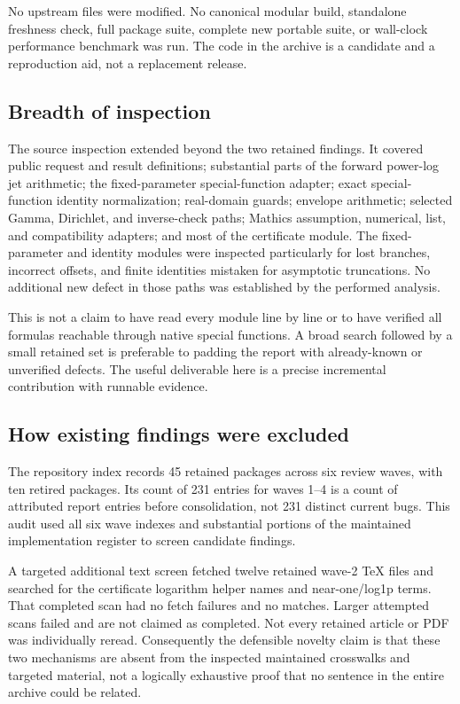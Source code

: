 \documentclass[11pt,letterpaper]{article}
\theoremstyle{remark}\newtheorem{remark}[proposition]{Remark}
\begin{document}
No upstream files were modified. No canonical modular build, standalone
freshness check, full package suite, complete new portable suite, or
wall-clock performance benchmark was run. The code in the archive is a
candidate and a reproduction aid, not a replacement release.

\subsection{Breadth of inspection}
The source inspection extended beyond the two retained findings. It covered
public request and result definitions; substantial parts of the forward
power-log jet arithmetic; the fixed-parameter special-function adapter; exact
special-function identity normalization; real-domain guards; envelope
arithmetic; selected Gamma, Dirichlet, and inverse-check paths; Mathics
assumption, numerical, list, and compatibility adapters; and most of the
certificate module. The fixed-parameter and identity modules were inspected
particularly for lost branches, incorrect offsets, and finite identities
mistaken for asymptotic truncations. No additional new defect in those paths
was established by the performed analysis.\cite{kernel,specialparam,specialident}

This is not a claim to have read every module line by line or to have
verified all formulas reachable through native special functions. A broad
search followed by a small retained set is preferable to padding the report
with already-known or unverified defects. The useful deliverable here is a
precise incremental contribution with runnable evidence.

\subsection{How existing findings were excluded}
The repository index records 45 retained packages across six review waves,
with ten retired packages. Its count of 231 entries for waves 1--4 is a count
of attributed report entries before consolidation, not 231 distinct current
bugs. This audit used all six wave indexes and substantial portions of the
maintained implementation register to screen candidate findings.\cite{reviews,status,wavefive,wavesix}

A targeted additional text screen fetched twelve retained wave-2 TeX files
and searched for the certificate logarithm helper names and near-one/log1p
terms. That completed scan had no fetch failures and no matches. Larger
attempted scans failed and are not claimed as completed. Not every retained
article or PDF was individually reread. Consequently the defensible novelty
claim is that these two mechanisms are absent from the inspected maintained
crosswalks and targeted material, not a logically exhaustive proof that no
sentence in the entire archive could be related.
\end{document}
